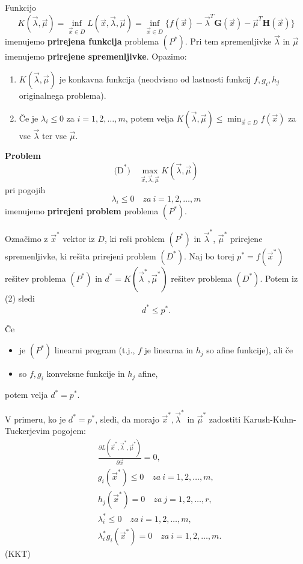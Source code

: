 \documentclass{article}
\begin{document}
\begin{multicols}{2}
Funkcijo
\[
K(\vec{\lambda}, \vec{\mu}) = \inf_{\vec{x} \in D} L(\vec{x}, \vec{\lambda}, \vec{\mu}) = \inf_{\vec{x} \in D} \{ f(\vec{x}) - \vec{\lambda}^T \mathbf{G}(\vec{x}) - \vec{\mu}^T \mathbf{H}(\vec{x}) \}
\]
imenujemo \textbf{prirejena funkcija} problema  $(P^*) $. Pri tem spremenljivke $ \vec{\lambda} $ in $ \vec{\mu} $ imenujemo \textbf{prirejene spremenljivke}. Opazimo:

\begin{enumerate}
\item \( K(\vec{\lambda}, \vec{\mu}) \) je konkavna funkcija (neodvisno od lastnosti funkcij \( f, g_i, h_j \) originalnega problema).
\item Če je \( \lambda_i \leq 0 \) za \( i = 1,2,\ldots,m \), potem velja \( K(\vec{\lambda}, \vec{\mu}) \leq \min_{\vec{x} \in D} f(\vec{x}) \) za vse \( \vec{\lambda} \) ter vse \( \vec{\mu} \).
\end{enumerate}


\textbf{Problem}
\[
\text{(D}^*\text{)} \quad \max_{\vec{x},\vec{\lambda}, \vec{\mu}} K(\vec{\lambda}, \vec{\mu})
\]
pri pogojih
\[
\lambda_i \leq 0 \quad za \ i = 1,2,\ldots,m
\]
imenujemo \textbf{prirejeni problem} problema \( (P^*) \).

Označimo z \( \vec{x}^* \) vektor iz \( D \), ki reši problem \( (P^*) \) in \( \vec{\lambda}^* \), \( \vec{\mu}^* \) prirejene spremenljivke, ki rešita prirejeni problem \( (D^*) \). Naj bo torej \( p^* = f(\vec{x}^*) \) rešitev problema \( (P^*) \) in \( d^* = K(\vec{\lambda}^*, \vec{\mu}^*) \) rešitev problema \( (D^*) \). Potem iz (2) sledi
\[
d^* \leq p^*.
\]

Če
\begin{itemize}
\item je \( (P^*) \) linearni program (t.j., \( f \) je linearna in \( h_j \) so afine funkcije), ali če
\item so \( f, g_i \) konveksne funkcije in \( h_j \) afine,
\end{itemize}
potem velja \( d^* = p^* \).

V primeru, ko je \( d^* = p^* \), sledi, da morajo \( \vec{x}^*, \vec{\lambda}^* \) in \( \vec{\mu}^* \) zadostiti Karush-Kuhn-Tuckerjevim pogojem:
\[
\begin{aligned}
&\frac{\partial L(\vec{x}^*, \vec{\lambda}^*, \vec{\mu}^*)}{\partial \vec{x}} = 0, \\
&g_i(\vec{x}^*) \leq 0 \quad za \ i = 1,2,\ldots,m, \\
&h_j(\vec{x}^*) = 0 \quad za \ j = 1,2,\ldots,r, \\
&\lambda_i^* \leq 0 \quad za \ i = 1,2,\ldots,m, \\
&\lambda_i^* g_i(\vec{x}^*) = 0 \quad za \ i = 1,2,\ldots,m.
\end{aligned}
\]
(KKT)



\end{multicols}
\end{document}
